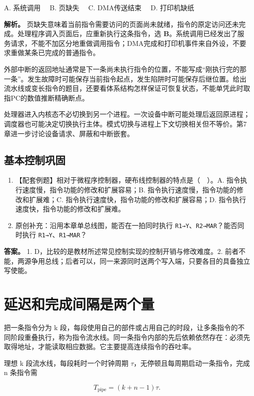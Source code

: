 A. 系统调用　 B. 页缺失　 C. DMA传送结束　 D. 打印机缺纸

\textbf{解析。} 页缺失意味着当前指令需要访问的页面尚未就绪，指令的原定访问还未完成。处理程序调入页面后，应重新执行这条指令，选 \textbf{B}。系统调用已经发出了服务请求，不能不加区分地重做调用指令；DMA完成和打印机事件来自外设，不要求重做某条已完成的普通指令。

外部中断的返回地址通常是下一条尚未执行指令的位置，不能写成``刚执行完的那一条''。发生故障时可能保存当前指令起点，发生陷阱时可能保存后继位置。给出流水线或变长指令的题目，还要看体系结构怎样保证可恢复状态，不能单凭此时取指PC的数值推断精确断点。

处理器进入内核态不必切换到另一个进程。一次设备中断可能处理后返回原进程；调度器也可能决定切换执行主体。模式切换与进程上下文切换相关但不等价。第7章进一步讨论设备请求、屏蔽和中断嵌套。

\subsection{基本控制巩固}\label{CO05-basic-check}

\begin{enumerate}
\def\labelenumi{\arabic{enumi}.}
\tightlist
\item
  【配套例题】相对于微程序控制器，硬布线控制器的特点是（　）。A. 指令执行速度慢，指令功能的修改和扩展容易；B. 指令执行速度慢，指令功能的修改和扩展难；C. 指令执行速度快，指令功能的修改和扩展容易；D. 指令执行速度快，指令功能的修改和扩展难。
\item
  原创补充：沿用本章单总线图，能否在一拍同时执行 \texttt{R1→Y}、\texttt{R2→MAR}？能否同时执行 \texttt{R1→Y}、\texttt{R1→MAR}？
\end{enumerate}

\textbf{答案。} 1. D，比较的是教材所述常见控制实现的控制开销与修改难度。2. 前者不能，两源争用总线；后者可以，同一来源同时送两个写入端，只要各目的具备独立写使能。

\section{延迟和完成间隔是两个量}\label{CO05-pipeline-performance}

把一条指令分为 k 段，每段使用自己的部件或占用自己的时段，让多条指令的不同阶段重叠执行，称为指令流水线。同一条指令内部的先后依赖依然存在：必须先取得地址，才能读取相应数据。它主要提高连续指令的吞吐率。

\begin{theorem}[理想标量流水线的总时间]

理想 k 段流水线，每段耗时一个时钟周期 \(\tau\)，无停顿且每周期启动一条指令，完成 n 条指令需

\[
T_{\mathrm{pipe}}=(k+n-1)\tau.
\]

\end{theorem}


